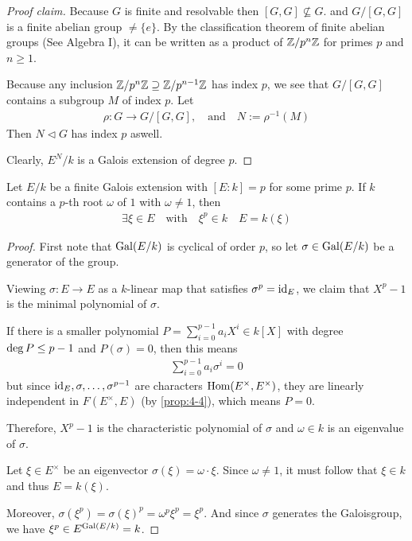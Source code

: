 \begin{proof}[Proof claim]

Because $G$ is finite and resolvable then $[G,G] \nsubseteq G$. and $G/[G,G]$ is a finite abelian group $\neq \{e\}$.
  By the classification theorem of finite abelian groups (See Algebra I), it can be written as a product of $\mathbb{Z}/p^{n}\mathbb{Z}$ for primes $p$ and $n \geq 1$.

  Because any inclusion $\mathbb{Z}/p^{n}\mathbb{Z} \supseteq \mathbb{Z}/p^{n-1}\mathbb{Z}$ has index $p$, we see that $G/[G,G]$ contains a subgroup $M$ of index $p$. Let
  \begin{align*}
    \rho: G \to  G/[G,G], \quad \text{and} \quad N := \rho^{-1}(M)
  \end{align*}
Then $N \lhd G$ has index $p$ aswell.

Clearly, $E^{N}/k$ is a Galois extension of degree $p$.
\end{proof}

\begin{lem}[] \label{lem:4-25}
  Let $E/k$ be a finite Galois extension with $[E:k] = p$ for some prime $p$.
  If $k$ contains a $p$-th root $\omega$ of $1$ with $\omega \neq 1$, then
  \begin{align*}
    \exists \xi \in E \quad \text{with} \quad 
    \xi^{p} \in k \quad E = k(\xi)
  \end{align*}
\end{lem}
\begin{proof}
First note that $\operatorname{Gal}(E/k)$ is cyclical of order $p$, so let $\sigma \in \operatorname{Gal}(E/k)$ be a generator of the group.

Viewing $\sigma: E \to E$ as a $k$-linear map that satisfies $\sigma^{p} = \operatorname{id}_E$, we claim that $X^{p}-1$ is the minimal polynomial of $\sigma$.

If there is a smaller polynomial $P = \sum_{i=0}^{p-1}a_i X^{i}\in k[X]$ with degree $\operatorname{deg} P \leq p-1$ and $P(\sigma) = 0$, then this means
\begin{align*}
  \sum_{i=0}^{p-1}a_i \sigma^{i} = 0
\end{align*}
but since
$\operatorname{id}_E, \sigma, \ldots, \sigma^{p-1}$ are characters $\operatorname{Hom}(E^{\times},E^{\times})$, they are linearly independent in $F(E^{\times},E)$ (by \ref{prop:4-4}), which means $P = 0$.

Therefore, $X^{p}-1$ is the characteristic polynomial of $\sigma$ and $\omega \in k$ is an eigenvalue of $\sigma$.

Let $\xi \in E^{\times}$ be an eigenvector $\sigma(\xi) = \omega \cdot \xi$. Since $\omega \neq 1$, it must follow that $\xi \in k$ and thus $E = k(\xi)$.

Moreover, $\sigma(\xi^{p}) = \sigma(\xi)^{p} = \omega^{p} \xi^{p} = \xi^{p}$.
And since $\sigma$ generates the Galoisgroup, we have $\xi^{p} \in E^{\operatorname{Gal}(E/k)} = k$.
\end{proof}



